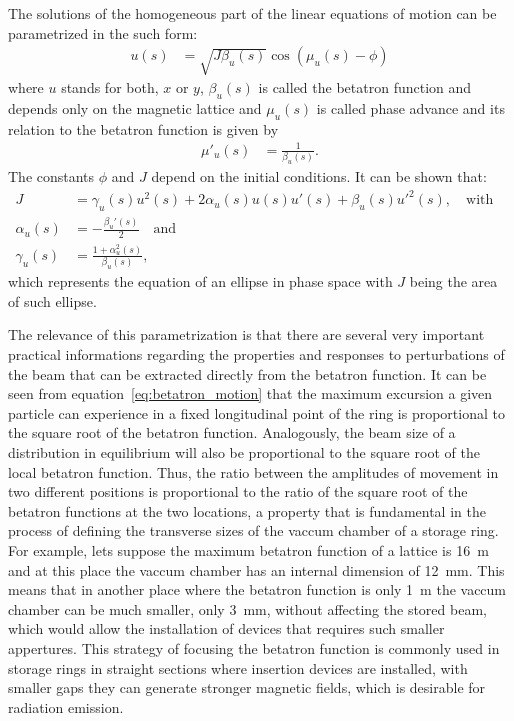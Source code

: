 	The solutions of the homogeneous part of the linear equations of motion can be parametrized in the such form:
	\begin{align} \label{eq:betatron_motion}
		u(s) &= \sqrt{J\beta_u(s)} \cos(\mu_u(s) - \phi)
	\end{align}
	where $u$ stands for both, $x$ or $y$, $\beta_u(s)$ is called the betatron function and depends only on the magnetic lattice and $\mu_u(s)$ is called phase advance and its relation to the betatron function is given by
	\begin{align}
		\mu'_u(s) &= \frac{1}{\beta_u(s)}.
	\end{align}
	The constants $\phi$ and $J$ depend on the initial conditions. It can be shown that:
	\begin{align} \label{eq:linear_invariant}
		J &= \gamma_u(s)u^2(s) + 2\alpha_u(s)u(s)u'(s) + \beta_u(s)u'^2(s),
												\quad \text{with}& \\
        \alpha_u(s) &= -\frac{\beta_u'(s)}{2} \quad \text{and}& \nonumber \\ \nonumber
		\gamma_u(s) &= \frac{1+\alpha_u^2(s)}{\beta_u(s)},&
	\end{align}
	which represents the equation of an ellipse in phase space with $J$ being the area of such ellipse.

	The relevance of this parametrization is that there are several very important practical informations regarding the properties and responses to perturbations of the beam that can be extracted directly from the betatron function. It can be seen from equation~\eqref{eq:betatron_motion} that the maximum excursion a given particle can experience in a fixed longitudinal point of the ring is proportional to the square root of the betatron function. Analogously, the beam size of a distribution in equilibrium will also be proportional to the square root of the local betatron function. Thus, the ratio between the amplitudes of movement in two different positions is proportional to the ratio of the square root of the betatron functions at the two locations, a property that is fundamental in the process of defining the transverse sizes of the vaccum chamber of a storage ring. For example, lets suppose the maximum betatron function of a lattice is \SI{16}{\meter} and at this place the vaccum chamber has an internal dimension of \SI{12}{\milli\meter}. This means that in another place where the betatron function is only \SI{1}{\meter} the vaccum chamber can be much smaller, only \SI{3}{\milli\meter}, without affecting the stored beam, which would allow the installation of devices that requires such smaller appertures. This strategy of focusing the betatron function is commonly used in storage rings in straight sections where insertion devices are installed, with smaller gaps they can generate stronger magnetic fields, which is desirable for radiation emission.

